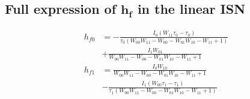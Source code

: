 \documentclass[10pt,conference,compsocconf,a4paper]{IEEEtran}
\renewcommand{\vec}[1]{\boldsymbol{#1}}
\begin{document}
	



\newpage



\appendix

\subsection{Full expression of $\vec{h_f}$ in the linear ISN}
\label{sec:hf_full}

\begin{equation*} \label{eq:hf_full}
	\begin{aligned}
		h_{f0} &= - \frac{I_{0} \left(W_{11} \tau_{0} - \tau_{0}\right)}{\tau_{0} \left(W_{00} W_{11} - W_{00} - W_{01} W_{10} - W_{11} + 1\right)} \\ &+\frac{I_{1} W_{01}}{W_{00} W_{11} - W_{00} - W_{01} W_{10} - W_{11} + 1}\\
		h_{f1} &= \frac{I_{0} W_{10}}{W_{00} W_{11} - W_{00} - W_{01} W_{10} - W_{11} + 1} \\ &- \frac{I_{1} \left(W_{00} \tau_{1} - \tau_{1}\right)}{\tau_{1} \left(W_{00} W_{11} - W_{00} - W_{01} W_{10} - W_{11} + 1\right)}
	\end{aligned}
\end{equation*}
\end{document}
